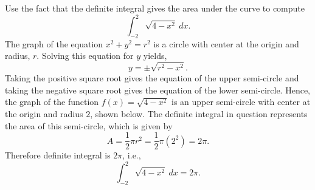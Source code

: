 \documentclass[handout]{ximera}
\begin{document}
\begin{example}[example 4]
Use the fact that the definite integral gives the area under the curve to compute
\[\int_{-2}^2 \sqrt{4-x^2} \ dx.\]
The graph of the equation $x^2 + y^2 = r^2$ is a circle with center at the origin and radius, $r$.
Solving this equation for $y$ yields,
\[
y = \pm \sqrt{r^2 - x^2}.
\]
Taking the positive square root gives the equation of the upper semi-circle and taking the negative square root gives 
the equation of the lower semi-circle.
Hence, the graph of the function $f(x) = \sqrt{4-x^2}$ is an upper semi-circle with center at the origin and radius $2$, shown below. 
The definite integral in question represents the area of this semi-circle, which is given by
\[
A = \frac12 \pi r^2 = \frac12 \pi (2^2) = 2\pi.
\]
Therefore definite integral is $2\pi$, i.e.,
\[\int_{-2}^2 \sqrt{4-x^2} \ dx =2\pi.\]



\begin{image}
\end{image}

\end{example}
\end{document}
